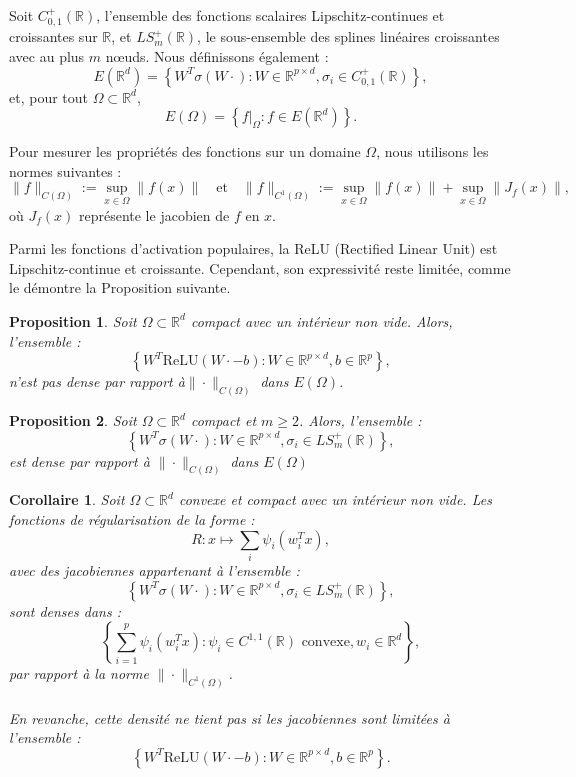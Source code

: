 \documentclass[a4paper, 12pt]{report} %
\newtheorem{corollary}{Corollaire}[section]
\newtheorem{proposition}{Proposition}[section]
\begin{document}
Soit \( C_{0,1}^+(\mathbb{R}) \), l'ensemble des fonctions scalaires Lipschitz-continues et croissantes sur \( \mathbb{R} \), et \( LS_m^+(\mathbb{R}) \), le sous-ensemble des splines linéaires croissantes avec au plus \( m \) nœuds. Nous définissons également :  
\[
E(\mathbb{R}^d) = \left\{ W^T \sigma(W \cdot) : W \in \mathbb{R}^{p \times d}, \sigma_i \in C_{0,1}^+(\mathbb{R}) \right\},
\]
et, pour tout \( \Omega \subset \mathbb{R}^d \),
\[
E(\Omega) = \left\{ f|_{\Omega} : f \in E(\mathbb{R}^d) \right\}.
\]

Pour mesurer les propriétés des fonctions sur un domaine \( \Omega \), nous utilisons les normes suivantes :
\[
\|f\|_{C(\Omega)} := \sup_{x \in \Omega} \|f(x)\| \quad \text{et} \quad \|f\|_{{C^1}(\Omega)} := \sup_{x \in \Omega} \|f(x)\| + \sup_{x \in \Omega} \|J_f(x)\|,
\]
où \( J_f(x) \) représente le jacobien de \( f \) en \( x \).

Parmi les fonctions d'activation populaires, la ReLU (Rectified Linear Unit) est Lipschitz-continue et croissante. Cependant, son expressivité reste limitée, comme le démontre la Proposition suivante.

\begin{proposition}
Soit \( \Omega \subset \mathbb{R}^d \) compact avec un intérieur non vide. Alors, l'ensemble :
\[
\left\{ W^T \text{ReLU}(W \cdot - b) : W \in \mathbb{R}^{p \times d}, b \in \mathbb{R}^p \right\},
\]
n'est pas dense par rapport à$ \| \cdot \|_{C(\Omega)}$ dans $E(\Omega)$.
\end{proposition}
\begin{proposition}
Soit \( \Omega \subset \mathbb{R}^d \) compact et \( m \geq 2 \). Alors, l'ensemble :
\[
\left\{ W^T \sigma(W \cdot) : W \in \mathbb{R}^{p \times d}, \sigma_i \in LS_m^+(\mathbb{R}) \right\},
\]
est dense par rapport à $\| \cdot \|_{C(\Omega)}$ dans $E(\Omega)$
\end{proposition}

\begin{corollary}
Soit \( \Omega \subset \mathbb{R}^d \) convexe et compact avec un intérieur non vide. Les fonctions de régularisation de la forme :
\[ R: x \mapsto \sum_{i} \psi_i(w_i^T x),\]
avec des jacobiennes appartenant à l'ensemble :
\[
\left\{ W^T \sigma(W \cdot) : W \in \mathbb{R}^{p \times d}, \sigma_i \in LS_m^+(\mathbb{R}) \right\},
\]
sont denses dans :
\[
\left\{\sum_{i=1}^p \psi_i(w_i^T x) : \psi_i \in C^{1,1}(\mathbb{R}) \text{ convexe}, w_i \in \mathbb{R}^d \right\},
\]
par rapport à la norme $\|\cdot\|_{{C^1}(\Omega)}$.\\\\
En revanche, cette densité ne tient pas si les jacobiennes sont limitées à l'ensemble :
\[
\left\{ W^T \text{ReLU}(W \cdot - b) : W \in \mathbb{R}^{p \times d}, b \in \mathbb{R}^p \right\}.
\]
\end{corollary}
\end{document}

